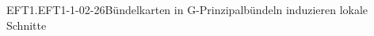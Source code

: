 \begin{REM}{EFT1.EFT1-1-02-26}{Bündelkarten in G-Prinzipalbündeln induzieren lokale Schnitte}

\end{REM}
